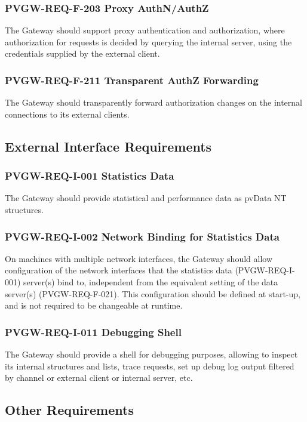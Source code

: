 \documentclass[11pt
  , a4paper
  , article
  , oneside
]{memoir}
\begin{document}
\subsubsection{PVGW-REQ-F-203 Proxy AuthN/AuthZ}
The Gateway should support proxy authentication and authorization, where authorization for requests is decided by querying the internal server, using the credentials supplied by the external client.

\subsubsection{PVGW-REQ-F-211 Transparent AuthZ Forwarding}
The Gateway should transparently forward authorization changes on the internal connections to its external clients.

\subsection{External Interface Requirements}
\subsubsection{PVGW-REQ-I-001 Statistics Data}
The Gateway should provide statistical and performance data as pvData NT structures.

\subsubsection{PVGW-REQ-I-002 Network Binding for Statistics Data}
On machines with multiple network interfaces, the Gateway should allow configuration of the network interfaces that the statistics data (PVGW-REQ-I-001) server(s) bind to, independent from the equivalent setting of the data server(s) (PVGW-REQ-F-021). This configuration should be defined at start-up, and is not required to be changeable at runtime.

\subsubsection{PVGW-REQ-I-011 Debugging Shell}
The Gateway should provide a shell for debugging purposes, allowing to inspect its internal structures and lists, trace requests, set up debug log output filtered by channel or external client or internal server, etc.

\subsection{Other Requirements}
\end{document}
